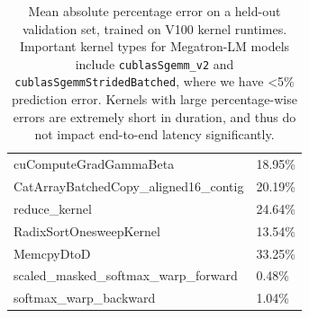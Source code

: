 \begin{table}[htbp]
\begin{tabular}{l l}
cuComputeGradGammaBeta & 18.95\% \\
CatArrayBatchedCopy\_aligned16\_contig & 20.19\% \\
reduce\_kernel & 24.64\% \\
RadixSortOnesweepKernel & 13.54\% \\
MemcpyDtoD & 33.25\% \\
scaled\_masked\_softmax\_warp\_forward & 0.48\% \\
softmax\_warp\_backward & 1.04\% \\
\bottomrule
\end{tabular}
\caption{Mean absolute percentage error on a held-out validation set, trained on V100 kernel runtimes. Important kernel types for Megatron-LM models include \texttt{cublasSgemm\_v2} and \texttt{cublasSgemmStridedBatched}, where we have <5\% prediction error. Kernels with large percentage-wise errors are extremely short in duration, and thus do not impact end-to-end latency significantly.}
\label{tab:v100_kernel_accuracy}
\end{table}

